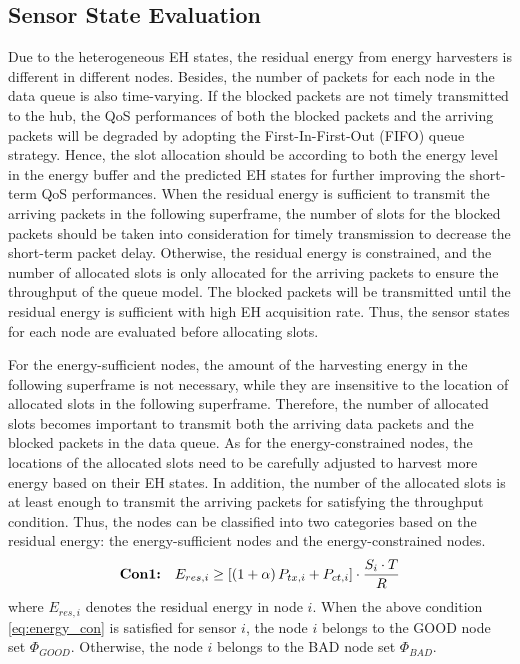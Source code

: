 \documentclass[journal,10pt]{IEEEtran}
\begin{document}
\subsection{Sensor State Evaluation}
Due to the heterogeneous EH states, the residual energy from energy harvesters is different in different nodes. Besides, the number of packets for each node in the data queue is also time-varying. 
If the blocked packets are not timely transmitted to the hub, the QoS performances of both the blocked packets and the arriving packets will be degraded by adopting the First-In-First-Out (FIFO) queue strategy. 
Hence, the slot allocation should be according to both the energy level in the energy buffer and the predicted EH states for further improving the short-term QoS performances. When the residual energy is sufficient to transmit the arriving packets in the following superframe, the number of slots for the blocked packets should be taken into consideration for timely transmission to decrease the short-term packet delay. 
Otherwise, the residual energy is constrained, and the number of allocated slots is only allocated for the arriving packets to ensure the throughput of the queue model. The blocked packets will be transmitted until the residual energy is sufficient with high EH acquisition rate.
Thus, the sensor states for each node are evaluated before allocating slots.

For the energy-sufficient nodes, the amount of the harvesting energy in the following superframe is not necessary, while they are insensitive to the location of allocated slots in the following superframe. 
Therefore, the number of allocated slots becomes important to transmit both the arriving data packets and the blocked packets in the data queue. 
As for the energy-constrained nodes, the locations of the allocated slots need to be carefully adjusted to harvest more energy based on their EH states. In addition, the number of the allocated slots is at least enough to transmit the arriving packets for satisfying the throughput condition.
Thus, the nodes can be classified into two categories based on the residual energy: the energy-sufficient nodes and the energy-constrained nodes.
\begin{equation} \label{eq:energy_con}
 \textbf{Con1:} \quad {E_{res,i}} \ge \left[ {\left( {1 + \alpha } \right){P_{tx,i}} + {P_{ct,i}}} \right] \cdot {{{S_i} \cdot T} \over R}
\end{equation}
where $E_{res,i}$ denotes the residual energy in node $i$. When the above condition \eqref{eq:energy_con} is satisfied for sensor $i$, the node $i$ belongs to the GOOD node set ${\Phi _{GOOD}}$. Otherwise, the node $i$ belongs to the BAD node set ${\Phi _{BAD}}$.
\end{document}
